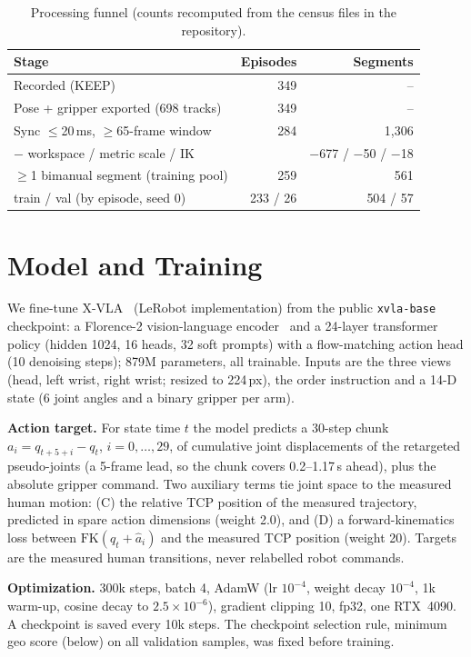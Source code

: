 \documentclass[conference,10pt]{IEEEtran}
\begin{document}
\begin{table}[t]
\centering\footnotesize
\caption{Processing funnel (counts recomputed from the census files in the repository).}
\label{tab:funnel}
\setlength{\tabcolsep}{4pt}\begin{tabular}{@{}lrr@{}}
\toprule
Stage & Episodes & Segments \\
\midrule
Recorded (KEEP) & 349 & -- \\
Pose + gripper exported (698 tracks) & 349 & -- \\
Sync $\le$20\,ms, $\ge$65-frame window & 284 & 1{,}306 \\
\quad $-$ workspace / metric scale / IK & & $-$677 / $-$50 / $-$18 \\
$\ge$1 bimanual segment (training pool) & 259 & 561 \\
\quad train / val (by episode, seed 0) & 233 / 26 & 504 / 57 \\
\bottomrule
\end{tabular}
\end{table}

\section{Model and Training}\label{sec:model}
We fine-tune X-VLA~\cite{zheng2025xvla} (LeRobot implementation) from the public \texttt{xvla-base} checkpoint: a Florence-2
vision-language encoder~\cite{xiao2024florence2} and a 24-layer transformer policy (hidden 1024, 16 heads, 32 soft prompts) with a
flow-matching action head (10 denoising steps); 879M parameters, all trainable. Inputs are the three views (head, left wrist,
right wrist; resized to 224\,px), the order instruction and a 14-D state (6 joint angles and a binary gripper per arm).

\textbf{Action target.} For state time $t$ the model predicts a 30-step chunk $a_i = q_{t+5+i}-q_t$, $i=0,\dots,29$, of
cumulative joint displacements of the retargeted pseudo-joints (a 5-frame lead, so the chunk covers 0.2--1.17\,s ahead), plus
the absolute gripper command. Two auxiliary terms tie joint space to the measured human motion: (C) the relative TCP position
of the measured trajectory, predicted in spare action dimensions (weight 2.0), and (D) a forward-kinematics loss between
$\mathrm{FK}(q_t+\hat a_i)$ and the measured TCP position (weight 20). Targets are the measured human transitions, never
relabelled robot commands.

\textbf{Optimization.} 300k steps, batch 4, AdamW (lr $10^{-4}$, weight decay $10^{-4}$, 1k warm-up, cosine decay to
$2.5\times10^{-6}$), gradient clipping 10, fp32, one RTX~4090. A checkpoint is saved every 10k steps.
The checkpoint selection rule, minimum geo score (below) on all validation samples, was fixed before training.
\end{document}
